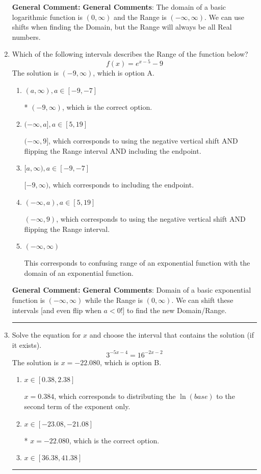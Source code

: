 \documentclass{extbook}[14pt]
\newcommand{\litem}[1]{\item #1

\rule{\textwidth}{0.4pt}}
\begin{document}
\begin{enumerate}
{\textbf{General Comment:} \textbf{General Comments}: The domain of a basic logarithmic function is $(0, \infty)$ and the Range is $(-\infty, \infty)$. We can use shifts when finding the Domain, but the Range will always be all Real numbers.
}
\litem{
Which of the following intervals describes the Range of the function below?
\[ f(x) = e^{x-5}-9 \]The solution is \( (-9, \infty) \), which is option A.\begin{enumerate}[label=\Alph*.]
\item \( (a, \infty), a \in [-9, -7] \)

* $(-9, \infty)$, which is the correct option.
\item \( (-\infty, a], a \in [5, 19] \)

$(-\infty, 9]$, which corresponds to using the negative vertical shift AND flipping the Range interval AND including the endpoint.
\item \( [a, \infty), a \in [-9, -7] \)

$[-9, \infty)$, which corresponds to including the endpoint.
\item \( (-\infty, a), a \in [5, 19] \)

$(-\infty, 9)$, which corresponds to using the negative vertical shift AND flipping the Range interval.
\item \( (-\infty, \infty) \)

This corresponds to confusing range of an exponential function with the domain of an exponential function.
\end{enumerate}

\textbf{General Comment:} \textbf{General Comments}: Domain of a basic exponential function is $(-\infty, \infty)$ while the Range is $(0, \infty)$. We can shift these intervals [and even flip when $a<0$!] to find the new Domain/Range.
}
\litem{
Solve the equation for $x$ and choose the interval that contains the solution (if it exists).
\[ 3^{-5x-4} = 16^{-2x-2} \]The solution is \( x = -22.080 \), which is option B.\begin{enumerate}[label=\Alph*.]
\item \( x \in [0.38, 2.38] \)

$x = 0.384$, which corresponds to distributing the $\ln(base)$ to the second term of the exponent only.
\item \( x \in [-23.08, -21.08] \)

* $x = -22.080$, which is the correct option.
\item \( x \in [36.38, 41.38] \)


\end{enumerate}}
\end{enumerate}
\end{document}
